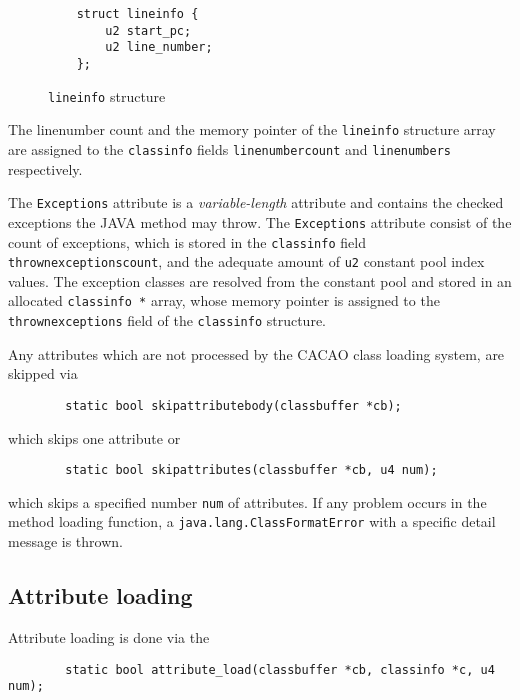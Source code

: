 \begin{figure}[h]
\begin{verbatim}
    struct lineinfo {
        u2 start_pc;
        u2 line_number;
    };
\end{verbatim}
\caption{\texttt{lineinfo} structure}
\label{lineinfostructure}
\end{figure}

The linenumber count and the memory pointer of the \texttt{lineinfo}
structure array are assigned to the \texttt{classinfo} fields
\texttt{linenumbercount} and \texttt{linenumbers} respectively.

The \texttt{Exceptions} attribute is a \textit{variable-length}
attribute and contains the checked exceptions the JAVA method may
throw. The \texttt{Exceptions} attribute consist of the count of
exceptions, which is stored in the \texttt{classinfo} field
\texttt{thrownexceptionscount}, and the adequate amount of \texttt{u2}
constant pool index values. The exception classes are resolved from
the constant pool and stored in an allocated \texttt{classinfo *}
array, whose memory pointer is assigned to the
\texttt{thrownexceptions} field of the \texttt{classinfo} structure.

Any attributes which are not processed by the CACAO class loading
system, are skipped via

\begin{verbatim}
        static bool skipattributebody(classbuffer *cb);
\end{verbatim}

which skips one attribute or

\begin{verbatim}
        static bool skipattributes(classbuffer *cb, u4 num);
\end{verbatim}

which skips a specified number \texttt{num} of attributes. If any
problem occurs in the method loading function, a
\texttt{java.lang.ClassFormatError} with a specific detail message is
thrown.


\subsection{Attribute loading}

Attribute loading is done via the

\begin{verbatim}
        static bool attribute_load(classbuffer *cb, classinfo *c, u4 num);
\end{verbatim}


